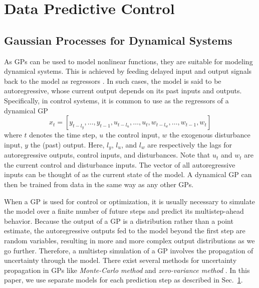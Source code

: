 \section{Data Predictive Control}
\label{S:dpc}

\subsection{Gaussian Processes for Dynamical Systems}
\label{S:intro-gp:control}

As GPs can be used to model nonlinear functions, they are suitable for modeling dynamical systems.
This is achieved by feeding delayed input and output signals back to the model as regressors \cite{kocijan16modelling}.
In such cases, the model is said to be autoregressive, whose current output depends on its past inputs and outputs.
Specifically, in control systems, it is common to use as the regressors of a dynamical GP
\begin{equation*}
x_t\!=\![y_{t-l_y}, \dots, y_{t-1}, u_{t-l_u}, \dots, u_t, w_{t-l_w}, \dots, w_{t-1}, w_t]
\end{equation*}
where \(t\) denotes the time step, \(u\) the control input, \(w\) the exogenous disturbance input, \(y\) the (past) output.
Here, \(l_y\), \(l_u\), and \(l_w\) are respectively the lags for autoregressive outputs, control inputs, and disturbances.
Note that \(u_t\) and \(w_t\) are the current control and disturbance inputs.
The vector of all autoregressive inputs can be thought of as the current state of the model.
A dynamical GP can then be trained from data in the same way as any other GPs.

When a GP is used for control or optimization, it is usually necessary to simulate the model over a finite number of future steps and predict its multistep-ahead behavior.
Because the output of a GP is a distribution rather than a point estimate, the autoregressive outputs fed to the model beyond the first step are random variables, resulting in more and more complex output distributions as we go further.
Therefore, a multistep simulation of a GP involves the propagation of uncertainty through the model.
There exist several methods for uncertainty propagation in GPs like \emph{Monte-Carlo method} and \emph{zero-variance method} \cite{girard04approximate,kocijan16modelling}. In this paper, we use separate models for each prediction step as described in Sec.~\ref{S:dpc}.



